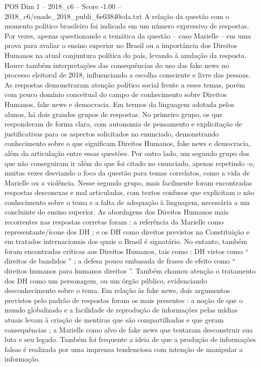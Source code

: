 \begin{textsample}{POS Dim 1 – 2018\_c6 – Score -1.00 – 2018\_c6/enade\_2018\_publi\_6e03840cda.txt}
A relação da questão com o momento político brasileiro foi indicada em um número expressivo de respostas.
Por vezes, apenas questionando a temática da questão – caso Marielle – em uma prova para avaliar o ensino superior no Brasil ou a importância dos Direitos Humanos na atual conjuntura política do país, levando à anulação da resposta.
Houve também interpretações das consequências do uso das fake news no processo eleitoral de 2018, influenciando a escolha consciente e livre das pessoas.
As respostas demonstraram atenção político social frente a esses temas, porém com pouco domínio conceitual do campo de conhecimento sobre Direitos Humanos, fake news e democracia.
Em termos da linguagem adotada pelos alunos, há dois grandes grupos de respostas.
No primeiro grupo, os que responderam de forma clara, com autonomia de pensamento e explicitação de justificativas para os aspectos solicitados no enunciado, demonstrando conhecimento sobre o que significam Direitos Humanos, fake news e democracia, além da articulação entre essas questões.
Por outro lado, um segundo grupo dos que não conseguiram ir além do que foi citado no enunciado, apenas repetindo -o, muitas vezes desviando o foco da questão para temas correlatos, como a vida de Marielle ou a violência.
Nesse segundo grupo, mais facilmente foram encontradas respostas desconexas e mal articuladas, com textos confusos que explicitam o não conhecimento sobre o tema e a falta de adequação à linguagem, necessária a um concluinte do ensino superior.
As abordagens dos Direitos Humanos mais recorrentes nas respostas corretas foram : a referência da Marielle como representante/ícone dos DH ; e os DH como direitos previstos na Constituição e em tratados internacionais dos quais o Brasil é signatário.
No entanto, também foram encontradas críticas aos Direitos Humanos, tais como : DH vistos como “ direitos de bandidos ” ; a defesa pouco embasada de frases de efeito como “ direitos humanos para humanos direitos ”.
Também chamou atenção o tratamento dos DH como um personagem, ou um órgão público, evidenciando desconhecimento sobre o tema.
Em relação às fake news, dois argumentos previstos pelo padrão de respostas foram os mais presentes : a noção de que o mundo globalizado e a facilidade de reprodução de informações pelas mídias atuais levam à criação de mentiras que são compartilhadas e que geram consequências ; a Marielle como alvo de fake news que tentaram desconstruir sua luta e seu legado.
Também foi frequente a ideia de que a produção de informações falsas é realizada por uma imprensa tendenciosa com intenção de manipular a informação.

\end{textsample}
